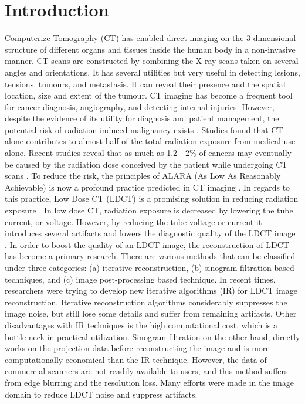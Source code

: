 \documentclass[journal]{IEEEtran}
\begin{document}
\section{Introduction}
\label{Introduction}
Computerize Tomography (CT) has enabled direct imaging on the 3-dimensional structure of different organs and tissues inside the human body in a non-invasive manner. CT scans are constructed by combining the X-ray scans taken on several angles and orientations.  It has several utilities but very useful in detecting lesions, tensions, tumours, and metastasis.  It can reveal their presence and the spatial location, size and extent of the tumour.  CT imaging has become a frequent tool for cancer diagnosis, angiography, and detecting internal injuries.  However, despite the evidence of its utility for diagnosis and patient management, the potential risk of radiation-induced malignancy exists \cite{brenner2007computed}.  Studies found that CT alone contributes to almost half of the total radiation exposure from medical use alone.  Recent studies reveal that as much as 1.2 - 2\% of cancers may eventually be caused by the radiation dose conceived by the patient while undergoing CT scans \cite{schauer2009national}.  To reduce the risk, the principles of ALARA (As Low As Reasonably Achievable) is now a profound practice predicted in CT imaging \cite{protection2007icrp}.  In regards to this practice, Low Dose CT (LDCT) is a promising solution in reducing radiation exposure \cite{trattner2014standardization}.  In low dose CT, radiation exposure is decreased by lowering the tube current, or voltage.  However, by reducing the tube voltage or current it introduces several artifacts and lowers the diagnostic quality of the LDCT image \cite{boas2012ct}.  In order to boost the quality of an LDCT image, the reconstruction of LDCT has become a primary research.  There are various methods that can be classified under three categories: (a) iterative reconstruction, (b) sinogram filtration based techniques, and (c) image post-processing based technique.  In recent times, researchers were trying to develop new iterative algorithms (IR) for LDCT image reconstruction.  Iterative reconstruction algorithms considerably suppresses the image noise, but still lose some details and suffer from remaining artifacts.  Other disadvantages with IR techniques is the high computational cost, which is a bottle neck in practical utilization.  Sinogram filtration on the other hand, directly works on the projection data before reconstructing the image and is more computationally economical than the IR technique.  However, the data of commercial scanners are not readily available to users, and this method suffers from edge blurring and the resolution loss.  Many efforts were made in the image domain to reduce LDCT noise and suppress artifacts.\\
\end{document}
